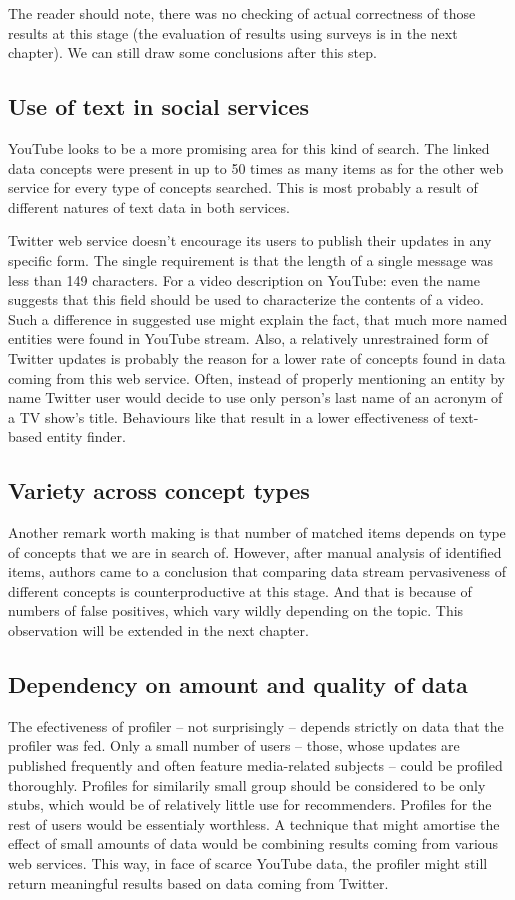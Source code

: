 The reader should note, there was no checking of actual correctness of those results at
this stage (the evaluation of results using surveys is in the next chapter). We
can still draw some conclusions after this step.

\subsection{Use of text in social services}
YouTube looks to be a more promising area for this kind of search. The
linked data concepts were present in up to 50 times as many items as for the other
web service for every type of concepts searched. This is most probably a
result of different natures of text data in both services.  

Twitter web service doesn't encourage its users to publish their updates in any
specific form. The single requirement is that the length of a single message
was less than 149 characters. For a video description on YouTube: even the name
suggests that this field should be used to characterize the contents
of a video. Such a difference in suggested use might explain the fact, that
much more named entities were found in YouTube stream. Also, a relatively
unrestrained form of Twitter updates is probably the reason for a lower rate of
concepts found in data coming from this web service. Often, instead of properly
mentioning an entity by name Twitter user would decide to use only person's
last name of an acronym of a TV show's title. Behaviours like that result in a
lower effectiveness of text-based entity finder.

\subsection{Variety across concept types}
Another remark worth making is that number of matched items depends on type of
concepts that we are in search of. However, after manual analysis of identified
items, authors came to a conclusion that comparing data stream pervasiveness of
different concepts is counterproductive at this stage. And that is because of
numbers of false positives, which vary wildly depending on the topic. This
observation will be extended in the next chapter.

\subsection{Dependency on amount and quality of data}

The efectiveness of profiler -- not surprisingly -- depends strictly on data
that the profiler was fed. Only a small number of users -- those, whose updates
are published frequently and often feature media-related subjects -- could be
profiled thoroughly. Profiles for similarily small group should be considered
to be only stubs, which would be of relatively little use for recommenders.
Profiles for the rest of users would be essentialy worthless. A technique that
might amortise the effect of small amounts of data would be combining results
coming from various web services. This way, in face of scarce YouTube data, the
profiler might still return meaningful results based on data coming from
Twitter.
